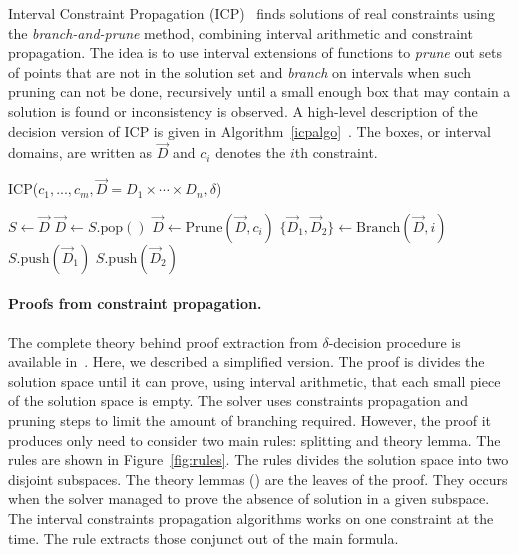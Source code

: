Interval Constraint Propagation (ICP)~\cite{handbookICP} finds
solutions of real constraints using the \emph{branch-and-prune} method, combining
interval arithmetic and constraint propagation. The idea is to use interval
extensions of functions to \emph{prune} out sets of points that are not in the
solution set and \emph{branch} on intervals when
such pruning can not be done, recursively until a small enough box
that may contain a solution is found or inconsistency is observed.
A high-level description of the decision version of ICP is given in Algorithm~\ref{icpalgo}~\cite{handbookICP,DBLP:conf/cade/GaoAC12}.
The boxes, or interval domains, are written as $\vec D$ and $c_i$ denotes the $i$th constraint.
\begin{algorithm}\label{algo1}
\caption{ICP($c_1,...,c_m, \vec D = D_1\times\cdots\times D_n, \delta$)}\label{icpalgo}
\begin{algorithmic}[1]
\Statex
    \State $S \gets \vec D$
        \State $\vec D \gets S.\mathrm{pop}()$
        \State $\vec D \gets \mathrm{Prune}(\vec D, c_i)$
        \EndWhile
                \State $\{\vec D_1,\vec D_2\} \gets \mathrm{Branch}(\vec D, i)$
                \State $S.\mathrm{push}(\vec D_1)$
                \State $S.\mathrm{push}(\vec D_2)$
            \Else
                \State {}
            \EndIf
        \EndIf
    \EndWhile
    \State {}
\end{algorithmic}
\end{algorithm}




\paragraph{Proofs from constraint propagation.}

The complete theory behind proof extraction from $\delta$-decision procedure is available in~\cite{DBLP:conf/synasc/GaoKC14}.
Here, we described a simplified version.
The proof is divides the solution space until it can prove, using interval arithmetic, that each small piece of the solution space is empty.
The solver uses constraints propagation and pruning steps to limit the amount of branching required.
However, the proof it produces only need to consider two main rules: splitting and theory lemma.
The rules are shown in Figure~\ref{fig:rules}.
The \splt rules divides the solution space into two disjoint subspaces.
The theory lemmas (\thLem) are the leaves of the proof.
They occurs when the solver managed to prove the absence of solution in a given subspace.
The interval constraints propagation algorithms works on one constraint at the time. 
The \weaken rule extracts those conjunct out of the main formula.

